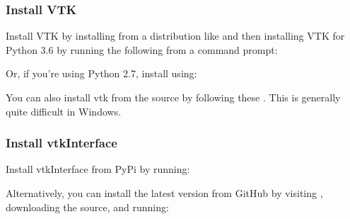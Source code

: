 \documentclass[letterpaper,10pt,english]{sphinxmanual}
\begin{document}
\subsubsection{Install VTK}
\label{\detokenize{installation:install-vtk}}
Install VTK by installing from a distribution like  and then installing VTK for Python 3.6 by running the following from a command prompt:

\begin{sphinxVerbatim}[commandchars=\\\{\}]
    
\end{sphinxVerbatim}

Or, if you’re using Python 2.7, install using:

\begin{sphinxVerbatim}[commandchars=\\\{\}]
    
\end{sphinxVerbatim}

You can also install vtk from the source by following these .  This is generally quite difficult in Windows.


\subsubsection{Install vtkInterface}
\label{\detokenize{installation:install-vtkinterface}}
Install vtkInterface from PyPi  by running:

\begin{sphinxVerbatim}[commandchars=\\\{\}]
  
\end{sphinxVerbatim}

Alternatively, you can install the latest version from GitHub by visiting , downloading the source, and running:

\begin{sphinxVerbatim}[commandchars=\\\{\}]
 \PYGZbs{}\PYGZbs{}\PYGZbs{}\PYGZbs{}
  
\end{sphinxVerbatim}
\end{document}
